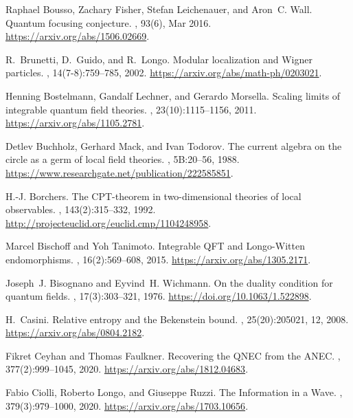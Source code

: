 \documentclass[12pt]{article}
\theoremstyle{remark}
\begin{document}
{\begin{thebibliography}{KLLSM18}
Raphael Bousso, Zachary Fisher, Stefan Leichenauer, and Aron~C. Wall.
\newblock Quantum focusing conjecture.
, 93(6), Mar 2016.
\newblock \url{https://arxiv.org/abs/1506.02669}.

R.~Brunetti, D.~Guido, and R.~Longo.
\newblock Modular localization and {W}igner particles.
, 14(7-8):759--785, 2002.
\newblock \url{https://arxiv.org/abs/math-ph/0203021}.

Henning Bostelmann, Gandalf Lechner, and Gerardo Morsella.
\newblock Scaling limits of integrable quantum field theories.
, 23(10):1115--1156, 2011.
\newblock \url{https://arxiv.org/abs/1105.2781}.

Detlev Buchholz, Gerhard Mack, and Ivan Todorov.
\newblock The current algebra on the circle as a germ of local field theories.
, 5B:20--56, 1988.
\newblock \url{https://www.researchgate.net/publication/222585851}.

H.-J. Borchers.
\newblock The {CPT}-theorem in two-dimensional theories of local observables.
, 143(2):315--332, 1992.
\newblock \url{http://projecteuclid.org/euclid.cmp/1104248958}.

Marcel Bischoff and Yoh Tanimoto.
\newblock Integrable {QFT} and {L}ongo-{W}itten endomorphisms.
, 16(2):569--608, 2015.
\newblock \url{https://arxiv.org/abs/1305.2171}.

Joseph~J. Bisognano and Eyvind~H. Wichmann.
\newblock On the duality condition for quantum fields.
, 17(3):303--321, 1976.
\newblock \url{https://doi.org/10.1063/1.522898}.

H.~Casini.
\newblock Relative entropy and the {B}ekenstein bound.
, 25(20):205021, 12, 2008.
\newblock \url{https://arxiv.org/abs/0804.2182}.

Fikret Ceyhan and Thomas Faulkner.
\newblock Recovering the {QNEC} from the {ANEC}.
, 377(2):999--1045, 2020.
\newblock \url{https://arxiv.org/abs/1812.04683}.

Fabio Ciolli, Roberto Longo, and Giuseppe Ruzzi.
\newblock The {I}nformation in a {W}ave.
, 379(3):979--1000, 2020.
\newblock \url{https://arxiv.org/abs/1703.10656}.


\end{thebibliography}}
\end{document}
